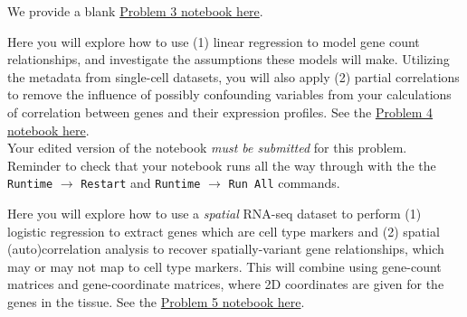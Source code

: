 \documentclass[11pt]{exam}
\begin{document}
\begin{questions}
We provide a blank \href{https://github.com/pachterlab/BI-BE-CS-183-2023/blob/main/HW2/Problem3.ipynb}{Problem 3 notebook here}.


\newpage
\question[28] 

Here you will explore how to use (1) linear regression to model gene count relationships, and investigate the assumptions these models will make. Utilizing the metadata from single-cell datasets, you will also apply (2) partial correlations to remove the influence of possibly confounding variables from your calculations of correlation between genes and their expression profiles. See the \href{https://github.com/pachterlab/BI-BE-CS-183-2023/blob/main/HW2/Problem4.ipynb}{Problem 4 notebook here}. \\

Your edited version of the notebook \textit{must be submitted } for this problem. Reminder to check that your notebook runs all the way through with the the {\tt Runtime} $\xrightarrow{}$ {\tt Restart} and {\tt Runtime} $\xrightarrow{}$ {\tt Run All} commands.\\


\question[28] 

Here you will explore how to use a \textit{spatial} RNA-seq dataset to perform (1) logistic regression to extract genes which are cell type markers and (2) spatial (auto)correlation analysis to recover spatially-variant gene relationships, which may or may not map to cell type markers. This will combine using gene-count matrices and gene-coordinate matrices, where 2D coordinates are given for the genes in the tissue. See the \href{https://github.com/pachterlab/BI-BE-CS-183-2023/blob/main/HW2/Problem5.ipynb}{Problem 5 notebook here}. \\


\end{questions}
\end{document}
